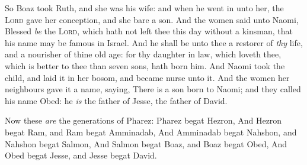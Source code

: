 \documentclass[11pt,letterpaper,oneside]{memoir}
\begin{document}
So Boaz took Ruth, and she was his wife: and when he went in unto her, 
the \textsc{Lord} gave her conception, and she bare a son. And the women 
said unto Naomi, Blessed \emph{be} the \textsc{Lord}, which hath not 
left thee this day without a kinsman, that his name may be famous in 
Israel. And he shall be unto thee a restorer of \emph{thy} life, and a 
nourisher of thine old age: for thy daughter in law, which loveth thee, 
which is better to thee than seven sons, hath born him. And Naomi took 
the child, and laid it in her bosom, and became nurse unto it. And the 
women her neighbours gave it a name, saying, There is a son born to 
Naomi; and they called his name Obed: he \emph{is} the father of Jesse, 
the father of David. 

Now these \emph{are} the generations of Pharez: Pharez begat Hezron, And 
Hezron begat Ram, and Ram begat Amminadab, And Amminadab begat Nahshon, 
and Nahshon begat Salmon, And Salmon begat Boaz, and Boaz begat Obed, 
And Obed begat Jesse, and Jesse begat David.
\end{document}
